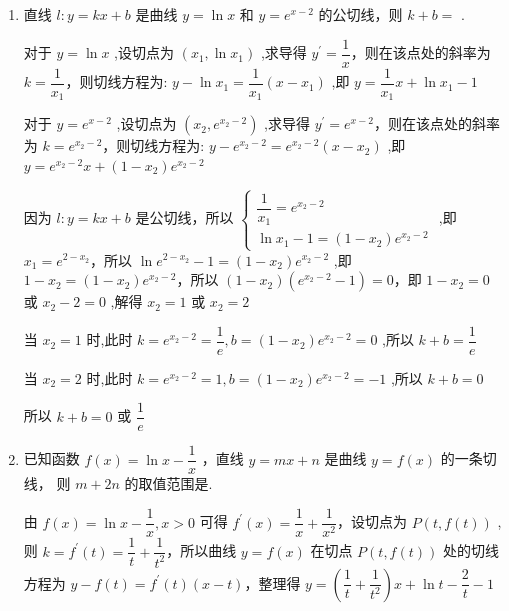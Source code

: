 \begin{enumerate}
    \item 直线 $l : y = {kx} + b$ 是曲线 $y = \ln x$ 和 $y = {{e}}^{x - 2}$ 的公切线，则 $k + b =$ .
    \begin{jieda}
        对于 $y = \ln x$ ,设切点为 $\left( {{x}_{1},\ln {x}_{1}}\right)$ ,求导得 ${y}^{\prime } = \dfrac{1}{x}$，则在该点处的斜率为 $k = \dfrac{1}{{x}_{1}}$，则切线方程为: $y - \ln {x}_{1} = \dfrac{1}{{x}_{1}}\left( {x - {x}_{1}}\right)$ ,即 $y = \dfrac{1}{{x}_{1}}x + \ln {x}_{1} - 1$
        
        对于 $y = {{e}}^{x - 2}$ ,设切点为 $\left( {{x}_{2},{{e}}^{{x}_{2} - 2}}\right)$ ,求导得 ${y}^{\prime } = {{e}}^{x - 2}$，则在该点处的斜率为 $k = {{e}}^{{x}_{2} - 2}$，则切线方程为: $y - {{e}}^{{x}_{2} - 2} = {{e}}^{{x}_{2} - 2}\left( {x - {x}_{2}}\right)$ ,即 $y = {{e}}^{{x}_{2} - 2}x + \left( {1 - {x}_{2}}\right) {{e}}^{{x}_{2} - 2}$
        
        因为 $l : y = {kx} + b$ 是公切线，所以 $\left\{  \begin{array}{l} \dfrac{1}{{x}_{1}} = {{e}}^{{x}_{2} - 2} \\  \ln {x}_{1} - 1 = \left( {1 - {x}_{2}}\right) {{e}}^{{x}_{2} - 2} \end{array}\right.$ ,即 ${x}_{1} = {{e}}^{2 - {x}_{2}}$，所以 $\ln {{e}}^{2 - {x}_{2}} - 1 = \left( {1 - {x}_{2}}\right) {{e}}^{{x}_{2} - 2}$ ,即 $1 - {x}_{2} = \left( {1 - {x}_{2}}\right) {{e}}^{{x}_{2} - 2}$，所以 $\left( {1 - {x}_{2}}\right) \left( {{{e}}^{{x}_{2} - 2} - 1}\right)  = 0$，即 $1 - {x}_{2} = 0$ 或 ${x}_{2} - 2 = 0$ ,解得 ${x}_{2} = 1$ 或 ${x}_{2} = 2$
        
        当 ${x}_{2} = 1$ 时,此时 $k = {{e}}^{{x}_{2} - 2} = \dfrac{1}{{e}},b = \left( {1 - {x}_{2}}\right) {{e}}^{{x}_{2} - 2} = 0$ ,所以 $k + b = \dfrac{1}{{e}}$
        
        当 ${x}_{2} = 2$ 时,此时 $k = {{e}}^{{x}_{2} - 2} = 1,b = \left( {1 - {x}_{2}}\right) {{e}}^{{x}_{2} - 2} =  - 1$ ,所以 $k + b = 0$
        
        所以 $k + b = 0$ 或 $\dfrac{1}{{e}}$
    \end{jieda}

    \item 已知函数 $f\left( x\right)  = \ln x - \dfrac{1}{x}$ ，直线 $y = {mx} + n$ 是曲线 $y = f\left( x\right)$ 的一条切线， 则 $m + {2n}$ 的取值范围是.
    \begin{jieda}
        由 $f\left( x\right)  = \ln x - \dfrac{1}{x},x > 0$ 可得 ${f}^{\prime }\left( x\right)  = \dfrac{1}{x} + \dfrac{1}{{x}^{2}}$，设切点为 $P\left( {t,f\left( t\right) }\right)$ ,则 $k = {f}^{\prime }\left( t\right)  = \dfrac{1}{t} + \dfrac{1}{{t}^{2}}$，所以曲线 $y = f\left( x\right)$ 在切点 $P\left( {t,f\left( t\right) }\right)$ 处的切线方程为 $y - f\left( t\right)  = {f}^{\prime }\left( t\right) \left( {x - t}\right)$，整理得 $y = \left( {\dfrac{1}{t} + \dfrac{1}{{t}^{2}}}\right) x + \ln t - \dfrac{2}{t} - 1$ 
        

\end{jieda}
\end{enumerate}
